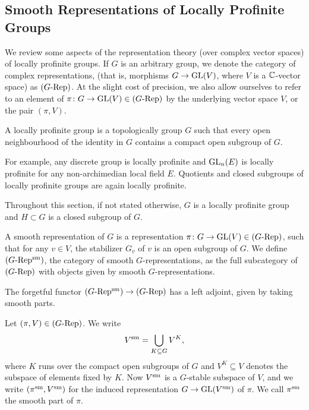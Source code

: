 \documentclass[../main.tex]{subfiles}
\begin{document}
\subsection{Smooth Representations of Locally Profinite Groups}
We review some aspects of the representation theory (over complex vector spaces)
of locally profinite groups. 
If $G$ is an arbitrary group, we denote the category of complex representations,
(that is, morphisms $G \to \operatorname{GL}(V)$, where $V$ is a $\mathbb{C}$-vector space) as
${({G}\text-\allowbreak\mathrm{Rep})}$. At the slight cost of precision, we also allow ourselves to refer to
an element of $\pi\colon G \to \operatorname{GL}(V) \in {({G}\text-\allowbreak\mathrm{Rep})}$ by the underlying vector space
$V$, or the pair $(\pi, V)$. 

\begin{defi}
  A locally profinite group is a topologically group $G$ such that
  every open neighbourhood of the identity in $G$ contains a compact open
  subgroup of $G$.
\end{defi}
For example, any discrete group is locally profinite and $\operatorname{GL}_n(E)$ is locally 
profinite for any non-archimedian local field $E$. Quotients and closed
subgroups of locally profinite groups are again locally profinite.

Throughout this section, if not stated otherwise, $G$ is a locally profinite
group and $H \subset G$ is a closed subgroup of $G$.

\begin{defi}
  A smooth representation of $G$ is a
  representation $\pi\colon G \to \operatorname{GL}(V) \in {({G}\text-\allowbreak\mathrm{Rep})}$,
  such that for any $v \in V$, the stabilizer $G_v$ of $v$ is an open subgroup
  of $G$. We define ${({G}\text-\allowbreak\mathrm{Rep^{\mathrm{sm}}})}$, the category of smooth $G$-representations, as
  the full subcategory of ${({G}\text-\allowbreak\mathrm{Rep})}$ with objects given by smooth $G$-representations.
\end{defi}

The forgetful functor ${({G}\text-\allowbreak\mathrm{Rep^{\mathrm{sm}}})} \to {({G}\text-\allowbreak\mathrm{Rep})}$ has a left adjoint, given by taking
smooth parts. 
\begin{defi}
  Let $(\pi,V) \in {({G}\text-\allowbreak\mathrm{Rep})}$. We write 
  \begin{equation*}
    V^{\mathrm{sm}} = \bigcup_{K \subseteq G} V^K,
  \end{equation*}
  where $K$ runs over the compact open subgroups of $G$ and $V^K \subseteq V$
  denotes the subspace of elements fixed by $K$. 
  Now $V^{\mathrm{sm}}$ is a $G$-stable subspace of $V$, and we write $(\pi^{\mathrm{sm}}, V^{\mathrm{sm}})$ 
  for the induced representation $G \to \operatorname{GL}(V^{\mathrm{sm}})$ of $\pi$.
  We call $\pi^{\mathrm{sm}}$ the smooth part of $\pi$.
\end{defi}
\end{document}
